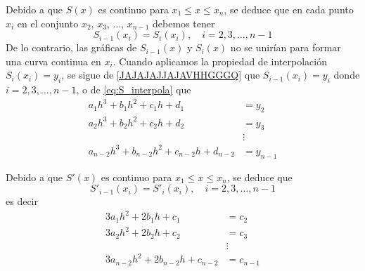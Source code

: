 \begin{tcolorbox}[
        arc=0mm, 
        bottomtitle=0.5mm,
        boxrule=0mm,
        colbacktitle=black!10!white, 
        coltitle=black,
        left=2.5mm,
        leftrule=1mm,
        right=3.5mm,
        title={$S(x)$ es continua en $[x_1, x_n]$.},
        toptitle=0.75mm,
        colframe=black!30!white,
    ]
    Debido a que $S(x)$ es continuo para $x_1 \leq x \leq x_n$, se deduce que en cada punto $x_i$ en el conjunto $x_2$, $x_3$, $\dots$, $x_{n-1}$ debemos tener
    \begin{equation}
        S_{i-1}(x_i) = S_i(x_i), \quad i = 2, 3, \dots, n-1 \label{JAJAJAJJAJAVHHGGGQ}
    \end{equation}
    De lo contrario, las gráficas de $S_{i-1}(x)$ y $S_i(x)$ no se unirían para formar una curva continua en $x_i$. Cuando aplicamos la propiedad de interpolación $S_i(x_i) = y_i$, se sigue de \eqref{JAJAJAJJAJAVHHGGGQ} que $S_{i-1}(x_i) = y_i$ donde $i = 2, 3, \dots, n-1$, o de \eqref{eq:S_interpola} que
    \begin{equation}
        \begin{aligned}
            a_1h^3 + b_1h^2 + c_1h + d_1 & = y_2 \\
            a_2h^3 + b_2h^2 + c_2h + d_2 & = y_3 \\
            & \vdots \\
            a_{n-2}h^3 + b_{n-2}h^2 + c_{n-2}h + d_{n-2} & = y_{n-1}
        \end{aligned} \label{UAUAJAHCCGTTQRTQHCCTAT}
    \end{equation}
\end{tcolorbox}

\begin{tcolorbox}[
        arc=0mm, 
        bottomtitle=0.5mm,
        boxrule=0mm,
        colbacktitle=black!10!white, 
        coltitle=black,
        left=2.5mm,
        leftrule=1mm,
        right=3.5mm,
        title={$S'(x)$ es continua en $[x_1, x_n]$.},
        toptitle=0.75mm,
        colframe=black!30!white,
    ]
    Debido a que $S'(x)$ es continuo para $x_1 \leq x \leq x_n$, se deduce que
    $$S'_{i-1}(x_i) = S'_i(x_i), \quad i = 2, 3, \dots, n-1$$
    es decir
    \begin{equation}
        \begin{aligned}
            3a_1h^2 + 2b_1h + c_1 & = c_2 \\
            3a_2h^2 + 2b_2h + c_2 & = c_3 \\
            & \vdots \\
            3a_{n-2}h^2 + 2b_{n-2}h + c_{n-2} & = c_{n-1}
        \end{aligned} \label{HAJAHAHCCFGYYYAGQTTQYQHHA}
    \end{equation}
\end{tcolorbox}

